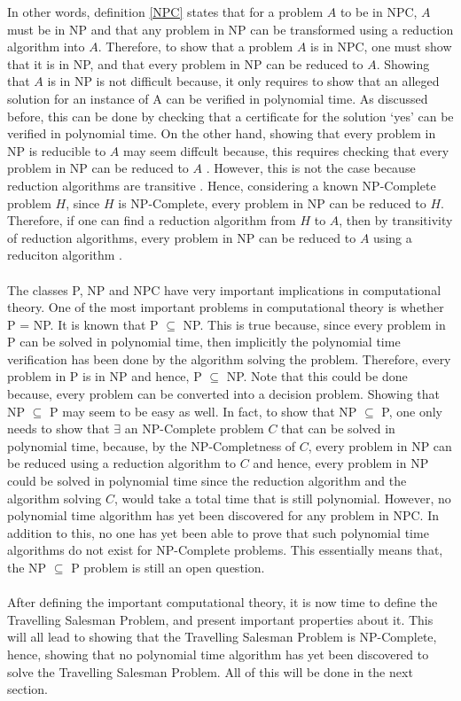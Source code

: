 \documentclass{article}
\begin{document}
In other words, definition \ref{NPC} states that for a problem $\mathit{A}$ to be in NPC, $\mathit{A}$ must be in NP and that any problem in NP can be transformed using a reduction algorithm into $\mathit{A}$. Therefore, to show that a problem $\mathit{A}$ is in NPC, one must show that it is in NP, and that every problem in NP can be reduced to $\mathit{A}$. Showing that $\mathit{A}$ is in NP is not difficult because, it only requires to show that an alleged solution for an instance of A can be verified in polynomial time. As discussed before, this can be done by checking that a certificate for the solution `yes' can be verified in polynomial time. On the other hand, showing that every problem in NP is reducible to $\mathit{A}$ may seem diffcult because, this requires checking that every problem in NP can be reduced to $\mathit{A}$ \cite{geeksforgeeks_2018_2}. However, this is not the case because reduction algorithms are transitive \cite{geeksforgeeks_2018_2}. Hence, considering a known NP-Complete problem $\mathit{H}$, since $\mathit{H}$ is NP-Complete, every problem in NP can be reduced to $\mathit{H}$. Therefore, if one can find a reduction algorithm from $\mathit{H}$ to $\mathit{A}$, then by transitivity of reduction algorithms, every problem in NP can be reduced to $\mathit{A}$ using a reduciton algorithm \cite{geeksforgeeks_2018_2}.\\\\
The classes P, NP and NPC have very important implications in computational theory. One of the most important problems in computational theory is whether P = NP. It is known that P $\subseteq$ NP. This is true because, since every problem in P can be solved in polynomial time, then implicitly the polynomial time verification has been done by the algorithm solving the problem. Therefore, every problem in P is in NP and hence, P $\subseteq$ NP. Note that this could be done because, every problem can be converted into a decision problem. Showing that NP $\subseteq$ P may seem to be easy as well. In fact, to show that NP $\subseteq$ P, one only needs to show that $\exists$ an NP-Complete problem $\mathit{C}$ that can be solved in polynomial time, because, by the NP-Completness of $\mathit{C}$, every problem in NP can be reduced using a reduction algorithm to $\mathit{C}$ and hence, every problem in NP could be solved in polynomial time since the reduction algorithm and the algorithm solving $\mathit{C}$, would take a total time that is still polynomial. However, no polynomial time algorithm has yet been discovered for any problem in NPC. In addition to this, no one has yet been able to prove that such polynomial time algorithms do not exist for NP-Complete problems. This essentially means that, the NP $\subseteq$ P problem is still an open question. \cite{cormen_leiserson_rivest_stein}\\\\
After defining the important computational theory, it is now time to define the Travelling Salesman Problem, and present important properties about it. This will all lead to showing that the Travelling Salesman Problem is NP-Complete, hence, showing that no polynomial time algorithm has yet been discovered to solve the Travelling Salesman Problem. All of this will be done in the next section.
\newpage
\end{document}
